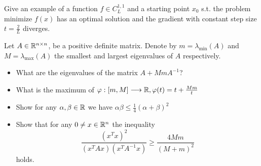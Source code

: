 \documentclass{ExerciseSheet}
\newif\ifsolutions
\begin{document}
\fi

\vskip 0.5cm
\begin{exo}
Give an example of a function $f\in C^{1,1}_L$ and a starting point $x_0$ s.t. the problem minimize $f(x)$ has an optimal solution and the gradient with constant step size $t=\frac{2}{L}$ diverges.
\end{exo}


\ifsolutions
\vskip 0.3cm
\begin{solution}
For example $f(x):\R^2 \rightarrow \R, f(x)=0.5(10x_1^2 + x_2^2)$. Then
\begin{equation*}
    \nabla f(x) = \left(
\begin{array}{c}
10x_1\\
x_2\\
\end{array}
\right), \quad L=10.
\end{equation*}
Choose for example $x_0 = (2, 0)$.
\end{solution}
\fi

\vskip 0.5cm
\begin{exo}
	Let $A\in \mathbb{R}^{n\times n}$, be a positive definite matrix. 
 Denote by $m=\lambda_{\text{min}}(A)$ and $M=\lambda_{\text{max}}(A)$ the smallest and largest eigenvalues of $A$ respectively. 
 \begin{itemize}
     \item What are the eigenvalues of the matrix $A+MmA^{-1}$?
     \item What is the maximum of $\varphi:[m,M]\longrightarrow \mathbb{R}, \varphi(t)=t+\frac{Mm}{t}$
    \item Show for any $\alpha, \beta \in \mathbb{R}$ we have $\alpha \beta \leq \frac{1}{4}(\alpha+\beta)^2$
    \item Show that for any $0\neq x \in \mathbb{R}^n$ the inequality \begin{equation*}
        \frac{(x^Tx)^2}{(x^TAx)(x^TA^{-1}x)} \geq \frac{4 Mm}{(M+m)^2}
    \end{equation*}
    holds.
 \end{itemize}
\end{exo}
\end{document}
